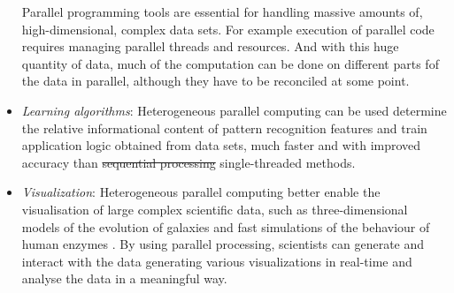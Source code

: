 \documentclass[10pt]{article}[draft]
\begin{document}
\begin{itemize}
	Parallel programming tools  are essential for handling  massive amounts of, high-dimensional, complex data sets. For example execution of parallel code requires managing parallel threads and resources.  And with this huge quantity of data, much of the computation can be done on different parts fof the data in parallel, although they have to be reconciled at some point. 

	
	
	
   
   \item \emph{Learning algorithms}: Heterogeneous parallel computing  can be used determine the relative informational content of pattern recognition features and train application logic obtained from data sets, much faster and with improved accuracy than \st{sequential processing} single-threaded methods.
   
   \item \emph{Visualization}: Heterogeneous parallel computing better enable the visualisation of large complex scientific data, such as three-dimensional models of the evolution of galaxies and fast simulations of the behaviour of human enzymes . By using parallel processing, scientists can generate and interact with the data generating various  visualizations in real-time and analyse the data in a meaningful way.


\end{itemize}
\end{document}
